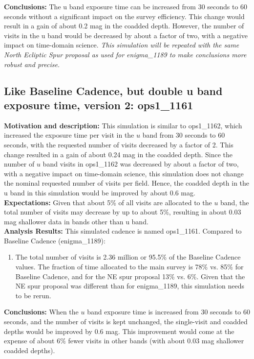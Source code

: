 \documentclass[manuscript]{article}
\begin{document}
{\bf Conclusions:} The u band exposure time can be increased from 30 seconds to
60 seconds without a significant impact on the survey efficiency. This change would
result in a gain of about 0.2 mag in the coadded depth. However, the number of visits
in the u band would be decreased by about a factor of two, with a negative impact on
time-domain science.  {\it This simulation will be repeated with the same North Ecliptic 
Spur proposal as used for enigma\_1189 to make conclusions more robust and precise.}



\subsection{Like Baseline Cadence, but double u band exposure time, version 2: ops1\_1161} 

{\bf Motivation and description:} This simulation is similar to ops1\_1162, 
which increased the exposure time per visit in the $u$ band from 30 seconds to 60 seconds,
with the requested number of visits decreased by a factor of 2. This change resulted
in a gain of about 0.24 mag in the coadded depth. Since the number of $u$ band visits 
in ops1\_1162 was decreased by about a factor of two, with a negative impact on
time-domain science, this simulation does not change the nominal requested number of 
visits per field. Hence, the coadded depth in the u band in this simulation would be improved by 
about 0.6 mag. \\

{\bf Expectations:}  Given that about 5\% of all visits are allocated to the $u$ band, 
the total number of visits may decrease by up to about 5\%, resulting in about 0.03 mag
shallower data in bands other than u band. \\

{\bf Analysis Results:}  This simulated cadence is named ops1\_1161.  Compared
to Baseline Cadence (enigma\_1189):
\begin{enumerate}
\item The total number of visits is 2.36 million or 95.5\% of the Baseline Cadence
values. The fraction of time allocated to the main survey is 78\% vs. 85\% for Baseline
Cadence, and for the NE spur proposal 13\% vs. 6\%. Given that the NE spur proposal
was different than for enigma\_1189, this simulation needs to be rerun. 
\end{enumerate}


{\bf Conclusions:} When the $u$ band exposure time is increased from 30 seconds to
60 seconds, and the number of visits is kept unchanged, the single-visit and coadded 
depths would be improved by 0.6 mag. This improvement would come at  the expense 
of about 6\% fewer visits in other bands (with about 0.03 mag shallower coadded depths). 
\end{document}
